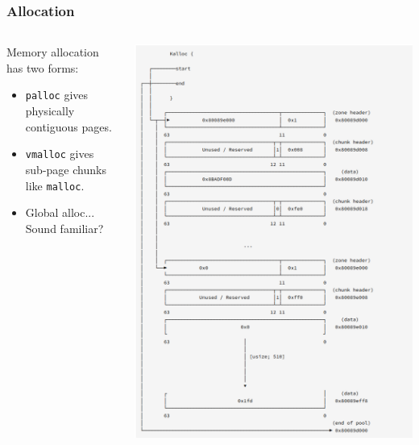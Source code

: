 \documentclass{beamer}
\begin{document}
\begin{frame}[fragile]
  \frametitle{Allocation}
  \begin{columns}
    \begin{column}{0.5\textwidth}
      Memory allocation has two forms:
      \begin{itemize}
      \item \verb_palloc_ gives physically contiguous pages.\\
      \item \verb_vmalloc_ gives sub-page chunks like \verb_malloc_.\\
      \item Global alloc... Sound familiar?
      \end{itemize}
    \end{column}
    \begin{column}{0.5\textwidth}
        \includegraphics[height=0.8\textheight]{vmalloc_ascii.png}
    \end{column}
  \end{columns}
\end{frame}
\end{document}
